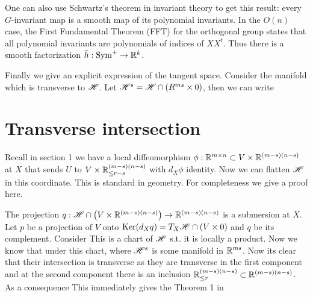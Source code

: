 \documentclass[]{note}
\begin{document}
One can also use Schwartz's theorem in invariant theory to get this result:
every $G$-invariant map is a smooth map of its polynomial invariants\cite{sch}. In the $O(n)$ case, the First Fundamental Theorem (FFT) for the orthogonal group 
 states that all polynomial invariants are polynomials of indices of $XX^t$\cite{weyl}.
  Thus there is a smooth factorization $\bar h:\mathrm{Sym}^+\to \mathbb{R}^k$.

Finally we give an explicit expression of the tangent space. Consider the manifold  which is transverse to $\mathscr H$. Let $\mathscr H^s=\mathscr H\cap (R^{ms}\times 0)$, then we can write


  \section{Transverse intersection}
Recall in section 1 we have a local diffeomorphism $\phi:\mathbb{R}^{m\times n} \subset V\times \mathbb{R}^{(m-s)(n-s)}$ at $X$ that sends $U$ to $V\times \mathbb{R}^{(m-s)(n-s)}_{\le r-s}$ with $d_X\phi$ identity. Now we can flatten $\mathscr H$ in this coordinate. This is standard in geometry. For completeness we give a proof here.

The projection $q:\mathscr H\cap \left(V\times \mathbb{R}^{(m-s)(n-s)}\right)\to \mathbb{R}^{(m-s)(n-s)}$ is a submersion at $X$. Let $p$ be a projection of $V$ onto $\text{Ker} (d_X q)=T_X\mathscr H\cap \left(V\times 0\right)$ and $q$ be its complement. Consider This is a chart of $\mathscr H$ s.t. it is locally a product. Now we know that under this chart, 
where $\mathscr H^s$ is some manifold in $\mathbb{R}^{ms}$. Now its clear  that their intersection is transverse as they are transverse in the first component and at the second component there is an inclusion $\mathbb{R}^{(m-s)(n-s)}_{\le r}\subset \mathbb{R}^{(m-s)(n-s)}$. As a consequence
This immediately gives the Theorem 1 in \cite{pap}
\end{document}
